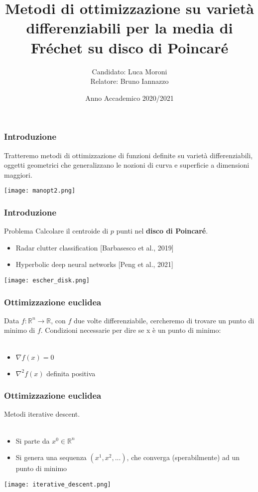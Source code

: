 \documentclass{beamer}
\title{Metodi di ottimizzazione su varietà differenziabili per la media di Fréchet su disco di Poincaré}
\author{\texorpdfstring{Candidato: Luca Moroni \\Relatore: Bruno Iannazzo}{Candidato}}
\date{Anno Accademico 2020/2021}
\begin{document}
\frame{\titlepage}

\begin{frame}
\frametitle{Introduzione}
\begin{beamerboxesrounded}{}
Tratteremo \alert{metodi di ottimizzazione} di funzioni definite su \alert{varietà differenziabili}, oggetti geometrici che generalizzano le nozioni di curva e superficie a dimensioni maggiori.
\bigskip
\end{beamerboxesrounded}
\begin{center}
    \texttt{[image: manopt2.png]} 
\end{center}
\end{frame}

\begin{frame}
\frametitle{Introduzione}
\begin{beamerboxesrounded}{Problema}
Calcolare il centroide di $p$ punti nel \textbf{disco di Poincaré}.
\end{beamerboxesrounded}
\bigskip
\begin{itemize}
    \item Radar clutter classification [Barbasesco et al., 2019] %
    \item Hyperbolic deep neural networks [Peng et al., 2021]
\end{itemize}
\bigskip
\begin{center}
    \texttt{[image: escher\_disk.png]} 
\end{center}
\end{frame}

\begin{frame}
\frametitle{Ottimizzazione euclidea}
Data $f : \mathbb{R}^n \to \mathbb{R}$, con $f$ due volte differenziabile, cercheremo di trovare un punto di minimo di $f$.
Condizioni necessarie per dire se x è un punto di minimo:\\~\

\begin{itemize}
\item $\nabla f(x) = 0$
\item $\nabla^2 f(x)$ definita positiva
\end{itemize}
\end{frame}

\begin{frame}
\frametitle{Ottimizzazione euclidea}
Metodi \alert{iterative descent.}\\~\

\begin{itemize}
    \item Si parte da $x^0 \in \mathbb{R}^n$
    \item Si genera una sequenza $(x^1, x^2,  ...)$, che converga (sperabilmente) ad un punto di minimo
\end{itemize}
\begin{center}
    \texttt{[image: iterative\_descent.png]} 
\end{center}
\end{frame}
\end{document}
